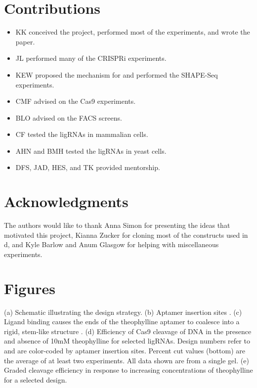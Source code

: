 \documentclass[10pt,oneside]{article}
\begin{document}
\section{Contributions}

\begin{itemize}
    \item KK conceived the project, performed most of the experiments, and wrote the paper.
    \item JL performed many of the CRISPRi experiments.
    \item KEW proposed the mechanism for \ligrnaB{} and performed the SHAPE-Seq experiments.
    \item CMF advised on the \invitro{} Cas9 experiments.
    \item BLO advised on the FACS screens.
    \item CF tested the ligRNAs in mammalian cells.
    \item AHN and BMH tested the ligRNAs in yeast cells.
    \item DFS, JAD, HES, and TK provided mentorship.
\end{itemize}

\section{Acknowledgments}

The authors would like to thank Anna Simon for presenting the ideas that motivated this project, Kianna Zucker for cloning most of the constructs used in d, and Kyle Barlow and Anum Glasgow for helping with miscellaneous experiments.

\section{Figures}



 (a) Schematic illustrating the design strategy.
%
%
 (b) Aptamer insertion sites \autocite{briner2014}.
%
%
 (c) Ligand binding causes the ends of the theophylline aptamer to coalesce into a rigid, stem-like structure \autocite{zimmerman1997}.
%
%
 (d) Efficiency of \invitro{} Cas9 cleavage of DNA in the presence and absence of 10mM theophylline for selected ligRNAs.  Design numbers refer to  and are color-coded by aptamer insertion sites.  Percent cut values (bottom) are the average of at least two experiments.  All data shown are from a single gel.
%
%
 (e) Graded cleavage efficiency in response to increasing concentrations of theophylline for a selected design.
\end{document}
